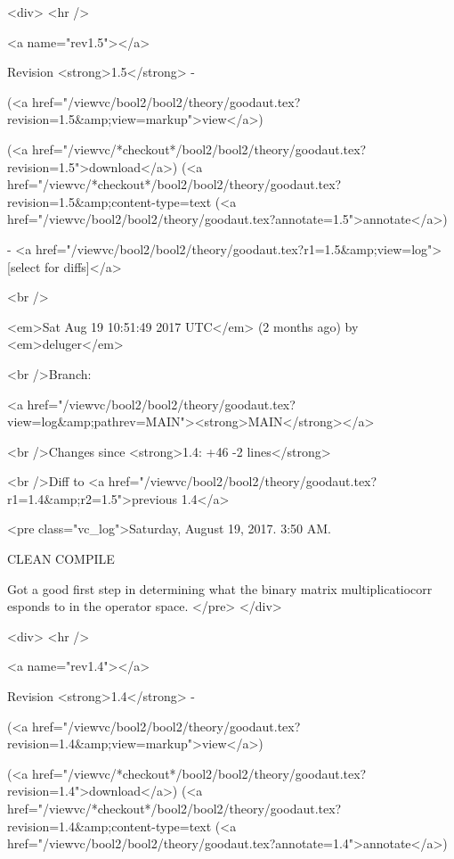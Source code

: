 <div>
<hr />

<a name="rev1.5"></a>


Revision <strong>1.5</strong> -


(<a href="/viewvc/bool2/bool2/theory/goodaut.tex?revision=1.5&amp;view=markup">view</a>)


(<a href="/viewvc/*checkout*/bool2/bool2/theory/goodaut.tex?revision=1.5">download</a>)
(<a href="/viewvc/*checkout*/bool2/bool2/theory/goodaut.tex?revision=1.5&amp;content-type=text%
(<a href="/viewvc/bool2/bool2/theory/goodaut.tex?annotate=1.5">annotate</a>)



- <a href="/viewvc/bool2/bool2/theory/goodaut.tex?r1=1.5&amp;view=log">[select for diffs]</a>




<br />

<em>Sat Aug 19 10:51:49 2017 UTC</em>
(2 months ago)
by <em>deluger</em>


<br />Branch:

<a href="/viewvc/bool2/bool2/theory/goodaut.tex?view=log&amp;pathrev=MAIN"><strong>MAIN</strong></a>







<br />Changes since <strong>1.4: +46 -2 lines</strong>








<br />Diff to <a href="/viewvc/bool2/bool2/theory/goodaut.tex?r1=1.4&amp;r2=1.5">previous 1.4</a>










<pre class="vc_log">Saturday, August 19, 2017.  3:50 AM.

CLEAN COMPILE

Got a good first step in determining what the binary matrix multiplicatiocorr
esponds to
in the operator space.
</pre>
</div>



<div>
<hr />

<a name="rev1.4"></a>


Revision <strong>1.4</strong> -


(<a href="/viewvc/bool2/bool2/theory/goodaut.tex?revision=1.4&amp;view=markup">view</a>)


(<a href="/viewvc/*checkout*/bool2/bool2/theory/goodaut.tex?revision=1.4">download</a>)
(<a href="/viewvc/*checkout*/bool2/bool2/theory/goodaut.tex?revision=1.4&amp;content-type=text%
(<a href="/viewvc/bool2/bool2/theory/goodaut.tex?annotate=1.4">annotate</a>)



